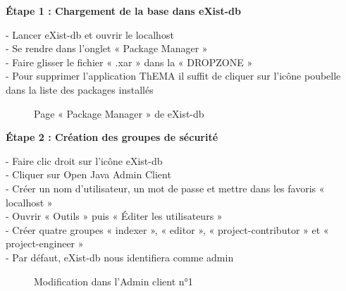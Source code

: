 \textbf{Étape 1 : Chargement de la base dans eXist-db}

\begin{flushleft}
- Lancer eXist-db et ouvrir le localhost \\
- Se rendre dans l'onglet « Package Manager » \\
- Faire glisser le fichier « .xar » dans la « DROPZONE » \\
- Pour supprimer l'application ThEMA il suffit de cliquer sur l'icône poubelle dans la liste des packages installés \\ 
\end{flushleft}

\begin{figure}[H]
	\centering
	\caption{Page « Package Manager » de eXist-db}
\end{figure}

\textbf{Étape 2 : Création des groupes de sécurité} 

\begin{flushleft}
	- Faire clic droit sur l'icône eXist-db \\
	- Cliquer sur Open Java Admin Client \\ 
	- Créer un nom d'utilisateur, un mot de passe et mettre dans les favoris « localhost » \\
	- Ouvrir « Outils » puis « Éditer les utilisateurs » \\
	- Créer quatre groupes « indexer », « editor », « project-contributor » et « project-engineer » \\
	- Par défaut, eXist-db nous identifiera comme admin \\
\end{flushleft}	

\begin{figure}[H]
	\centering
	\caption{Modification dans l'Admin client n°1}
\end{figure}
	
